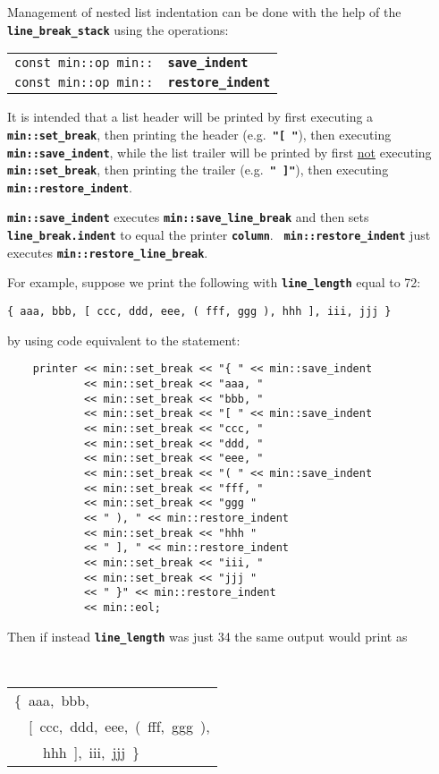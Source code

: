 \documentclass[12pt]{article}
\makeatletter
\newcommand{\TT}[1]{{\tt \bfseries #1}}
\newcommand{\ttindex}[1]{\index{#1@{\tt #1}}}
\newcommand{\EOL}{\penalty \exhyphenpenalty}
\newenvironment{indpar}[1][0.3in]%
	{\begin{list}{}%
		     {\setlength{\itemsep}{0in}%
		      \setlength{\topsep}{0in}%
		      \setlength{\parsep}{1ex}%
		      \setlength{\labelwidth}{#1}%
		      \setlength{\leftmargin}{#1}%
		      \addtolength{\leftmargin}{\labelsep}}%
	 \item}%
	{\end{list}}
\newcommand{\LABEL}[1]{\label{#1}}
\newcommand{\MINKEY}[1]%
	   {\TT{#1}\ttindex{min::#1}\ttindex{#1}}
\makeatother
\begin{document}
Management of nested list indentation can be done with the help of
the \TT{line\_\EOL break\_\EOL stack} using the operations:

\begin{indpar}[1em]\begin{tabular}{r@{}l}
\verb|const min::op min::|
    & \MINKEY{save\_indent}
\LABEL{MIN::SAVE_INDENT} \\
\verb|const min::op min::|
    & \MINKEY{restore\_indent}
\LABEL{MIN::RESTORE_INDENT} \\
\end{tabular}\end{indpar}

It is intended that a list header will be printed by first
executing a \TT{min::\EOL set\_\EOL break}, then printing the
header (e.g.~\TT{"[ "}), then executing
\TT{min::save\_indent}, while the list trailer will be printed
by first \underline{not} executing \TT{min::\EOL set\_\EOL break},
then printing the trailer (e.g.~\TT{" ]"}), then executing
\TT{min::\EOL restore\_\EOL indent}.

\TT{min::save\_indent} executes
\TT{min::\EOL save\_\EOL line\_\EOL break} and then
sets \TT{line\_\EOL break.indent} to equal the printer
\TT{column}.
~\TT{min::restore\_\EOL indent} just
executes \TT{min::\EOL restore\_\EOL line\_\EOL break}.

For example, suppose we print the following
with \TT{line\_\EOL length} equal to 72:
\begin{center}
\tt \{~aaa,~bbb,~[~ccc,~ddd,~eee,~(~fff,~ggg~),~hhh~],~iii,~jjj~\}
\end{center}
by using code equivalent to the statement:
\begin{indpar}\begin{verbatim}
    printer << min::set_break << "{ " << min::save_indent
            << min::set_break << "aaa, "
            << min::set_break << "bbb, "
            << min::set_break << "[ " << min::save_indent 
            << min::set_break << "ccc, "
            << min::set_break << "ddd, "
            << min::set_break << "eee, "
            << min::set_break << "( " << min::save_indent 
            << min::set_break << "fff, "
            << min::set_break << "ggg "
            << " ), " << min::restore_indent 
            << min::set_break << "hhh "
            << " ], " << min::restore_indent 
            << min::set_break << "iii, "
            << min::set_break << "jjj "
            << " }" << min::restore_indent 
            << min::eol;
\end{verbatim}\end{indpar}
Then if instead \TT{line\_\EOL length} was just 34 the same output would
print as
\begin{center}
\tt
\begin{tabular}{l}
\{~aaa,~bbb, \\
~~[~ccc,~ddd,~eee,~(~fff,~ggg~), \\
~~~~hhh~],~iii,~jjj~\} \\
\end{tabular}
\end{center}
\end{document}
